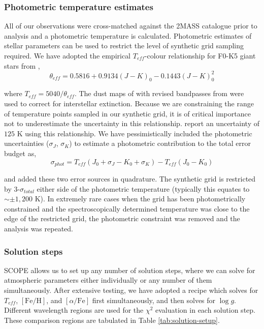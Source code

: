 \documentclass{emulateapj}
\begin{document}


\subsubsection{Photometric temperature estimates}
\label{sec:photometric-estimates}

All of our observations were cross-matched against the 2MASS catalogue prior to analysis and a photometric temperature is calculated. Photometric estimates of stellar parameters can be used to restrict the level of synthetic grid sampling required. We have adopted the empirical $T_{eff}$-colour relationship for F0-K5 giant stars from \citet{Alonso;et-al},
\begin{equation}
\theta_{eff} = 0.5816 + 0.9134(J-K)_0 - 0.1443(J-K)_{0}^2
\end{equation}

\noindent{}where $T_{eff} = 5040/\theta_{eff}$. The dust maps of \citet{Schlegel;et-al_1998} with revised bandpasses from \citet{Schonrich;et-al_2011} were used to correct for interstellar extinction. Because we are constraining the range of temperature points sampled in our synthetic grid, it is of critical importance not to underestimate the uncertainty in this relationship. \citet{Alonso;et-al} report an uncertainty of $125$ K using this relationship. We have pessimistically included the photometric uncertainties ($\sigma_J$, $\sigma_K$) to estimate a photometric contribution to the total error budget as,
\begin{equation}
\sigma_{phot} = T_{eff}(J_0+\sigma_J - K_0 +\sigma_K) - T_{eff}(J_0 - K_0)
\end{equation}

\noindent{}and added these two error sources in quadrature. The synthetic grid is restricted by 3-$\sigma_{total}$ either side of the photometric temperature (typically this equates to $\sim\pm1,200$ K). In extremely rare cases when the grid has been photometrically constrained and the spectroscopically determined temperature was close to the edge of the restricted grid, the photometric constraint was removed and the analysis was repeated.

\subsubsection{Solution steps}
\label{sec:solution-steps}

SCOPE allows us to set up any number of solution steps, where we can solve for atmospheric parameters either individually or any number of them simultaneously. After extensive testing, we have adopted a recipe which solves for $T_{eff}$, $[\mbox{Fe}/\mbox{H}]$, and $[\alpha/\mbox{Fe}]$ first simultaneously, and then solves for $\log{g}$. Different wavelength regions are used for the $\chi^2$ evaluation in each solution step. These comparison regions are tabulated in Table \ref{tab:solution-setup}.
\end{document}
